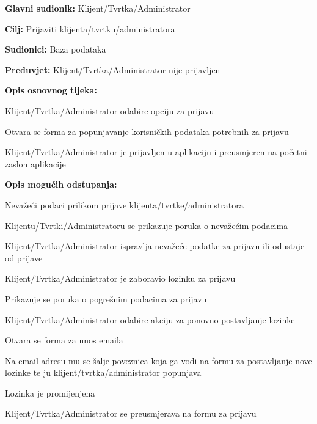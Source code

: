 \noindent {}
\begin{packed_item}

	\item \textbf{Glavni sudionik:} Klijent/Tvrtka/Administrator
	\item \textbf{Cilj:} Prijaviti klijenta/tvrtku/administratora
	\item \textbf{Sudionici:} Baza podataka
	\item \textbf{Preduvjet:} Klijent/Tvrtka/Administrator nije prijavljen
	\item \textbf{Opis osnovnog tijeka:}
	
	\item[] \begin{packed_enum}
		
		\item Klijent/Tvrtka/Administrator odabire opciju za prijavu
		\item Otvara se forma za popunjavanje korisničkih podataka potrebnih za prijavu
		\item Klijent/Tvrtka/Administrator je prijavljen u aplikaciju i preusmjeren na početni zaslon aplikacije

	\end{packed_enum}

	\item  \textbf{Opis mogućih odstupanja:}
	
	\item[] \begin{packed_item}
	
		\item[2.a] Nevažeći podaci prilikom prijave klijenta/tvrtke/administratora
		\item[] \begin{packed_enum}
			
			\item Klijentu/Tvrtki/Administratoru se prikazuje poruka o nevažećim podacima
			\item Klijent/Tvrtka/Administrator ispravlja nevažeće podatke za prijavu ili odustaje od prijave
			
		\end{packed_enum}
		
		\item[2.b] Klijent/Tvrtka/Administrator je zaboravio lozinku za prijavu
		\item[] \begin{packed_enum}
			
			\item Prikazuje se poruka o pogrešnim podacima za prijavu 
			\item Klijent/Tvrtka/Administrator odabire akciju za ponovno postavljanje lozinke
			\item Otvara se forma za unos emaila
			\item Na email adresu mu se šalje poveznica koja ga vodi na formu za postavljanje nove lozinke te ju klijent/tvrtka/administrator popunjava
			\item Lozinka je promijenjena
			\item Klijent/Tvrtka/Administrator se preusmjerava na formu za prijavu
			

\end{packed_enum}
\end{packed_item}
\end{packed_item}
